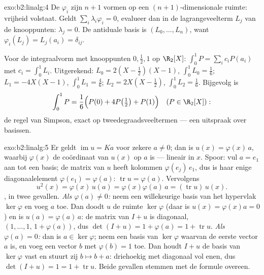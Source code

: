 \begin{solution}{exo:b2:linalg:4}
De $\varphi_i$ zijn $n + 1$ vormen op een $(n+1)$-dimensionale
ruimte: vrijheid volstaat. Geldt $\sum_i \lambda_i \varphi_i = 0$,
evalueer dan in de lagrangeveelterm $L_j$ van de knooppunten:
$\lambda_j = 0$. De antiduale basis is $(L_0, \dots, L_n)$, want
$\varphi_i(L_j) = L_j(a_i) = \delta_{ij}$.

Voor de integraalvorm met knooppunten $0, \frac12, 1$ op
$\R_2[X]$: $\int_0^1 P = \sum_i c_i P(a_i)$ met $c_i = \int_0^1
L_i$. Uitgerekend: $L_0 = 2(X - \tfrac12)(X - 1)$, $\int_0^1 L_0 =
\frac16$; $L_1 = -4X(X-1)$, $\int_0^1 L_1 = \frac46$; $L_2 = 2X(X
- \tfrac12)$, $\int_0^1 L_2 = \frac16$. Bijgevolg is
\[
\int_0^1 P = \frac{1}{6}\Bigl(P(0) + 4P\bigl(\tfrac12\bigr) +
P(1)\Bigr)
\quad (P \in \R_2[X]) :
\]
de regel van Simpson, exact op tweedegraadsveeltermen --- een
uitspraak over  basissen.
\end{solution}

\begin{solution}{exo:b2:linalg:5}
Er geldt $\operatorname{im} u = Ka$ voor zekere $a \neq 0$; dan is
$u(x) = \varphi(x)\,a$, waarbij $\varphi(x)$ de coördinaat van
$u(x)$ op $a$ is --- lineair in $x$. Spoor: vul $a = e_1$ aan tot
een basis; de matrix van $u$ heeft kolommen $\varphi(e_j)\,e_1$,
dus is haar enige diagonaalelement $\varphi(e_1) = \varphi(a)$:
$\operatorname{tr} u = \varphi(a)$. Vervolgens
\[
u^2(x) = \varphi(x)\, u(a) = \varphi(x)\varphi(a)\, a
= (\operatorname{tr} u)\, u(x).
\]
, in twee gevallen. \emph{Als $\varphi(a) \neq 0$:} neem
een willekeurige basis van het hypervlak $\ker\varphi$ en voeg $a$
toe. Dan doodt $u$ de ruimte $\ker\varphi$ (daar is $u(x) =
\varphi(x)a = 0$) en is $u(a) = \varphi(a)\,a$: de matrix van $I +
u$ is diagonaal, $(1, \dots, 1,\, 1 + \varphi(a))$, dus $\det(I +
u) = 1 + \varphi(a) = 1 + \operatorname{tr} u$. \emph{Als
$\varphi(a) = 0$:} dan is $a \in \ker\varphi$; neem een basis van
$\ker\varphi$ waarvan de eerste vector $a$ is, en voeg een vector
$b$ met $\varphi(b) = 1$ toe. Dan houdt $I + u$ de basis van
$\ker\varphi$ vast en stuurt zij $b \mapsto b + a$: driehoekig met
diagonaal vol enen, dus $\det(I + u) = 1 = 1 + \operatorname{tr}
u$. Beide gevallen stemmen met de formule overeen.
\end{solution}

